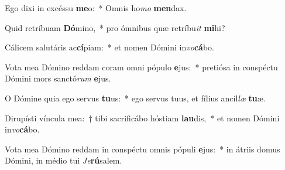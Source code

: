 \item Ego dixi in excéssu \textbf{me}o:~* Omnis ho\textit{mo} \textbf{men}dax.
\item Quid retríbuam \textbf{Dó}mino,~* pro ómnibus quæ retríbu\tinyhspace\textit{it} \textbf{mi}hi?
\item Cálicem salutáris ac\textbf{cí}piam:~* et nomen Dómini in\textit{vo}\textbf{cá}bo.
\item Vota mea Dómino reddam coram omni pópulo \textbf{e}jus:~* pretiósa in conspé\-ctu Dómini mors sanctó\textit{rum} \textbf{e}jus.
\item O Dómine quia ego servus \textbf{tu}us:~* ego servus tuus, et fílius ancíl\textit{læ} \textbf{tu}æ.
\item Dirupísti víncula mea:~† tibi sacrificábo hóstiam \textbf{lau}dis,~* et nomen Dómini in\textit{vo}\textbf{cá}bo.
\item Vota mea Dómino reddam in conspéctu omnis pópuli \textbf{e}jus:~* in átriis domus Dómini, in médio tui \tinyhspace\textit{Je}\textbf{rú}salem.
